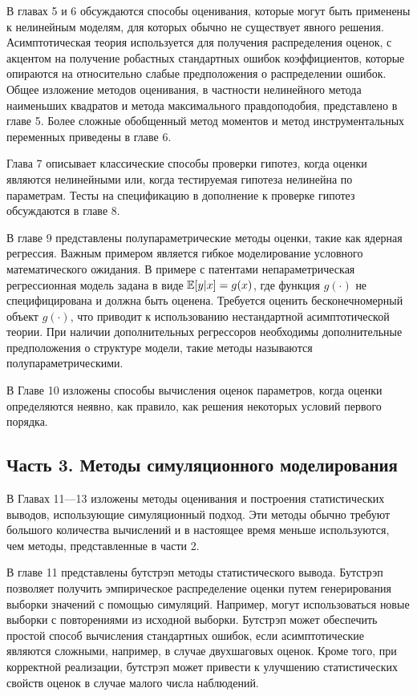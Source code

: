 В главах 5 и 6 обсуждаются способы оценивания, которые могут быть применены к нелинейным моделям, для которых обычно не существует явного решения. Асимптотическая теория используется для получения распределения оценок, с акцентом на получение робастных стандартных  ошибок коэффициентов, которые опираются на относительно слабые предположения о распределении ошибок. 
Общее изложение методов оценивания, в частности нелинейного метода наименьших квадратов и метода максимального правдоподобия, представлено в главе 5. Более сложные обобщенный метод моментов и метод инструментальных переменных приведены в главе 6.
	
	
Глава 7 описывает классические способы проверки гипотез, когда оценки являются нелинейными или, когда тестируемая гипотеза нелинейна по параметрам. Тесты на спецификацию  в дополнение к проверке гипотез обсуждаются в главе 8.
	
	
В главе 9 представлены полупараметрические методы оценки, такие как ядерная регрессия. Важным примером  является гибкое моделирование условного математического ожидания. В примере с патентами непараметрическая регрессионная модель задана в виде  $\mathbb{E}[y|x] = g(x)$, где функция $g(\cdot)$ не специфицирована и должна быть оценена. Требуется оценить бесконечномерный объект $g(\cdot)$, что приводит к использованию нестандартной асимптотической теории. При наличии дополнительных регрессоров необходимы  дополнительные предположения о структуре модели, такие  методы называются полупараметрическими.
	
	
В Главе 10 изложены способы вычисления оценок параметров, когда оценки определяются неявно, как правило, как решения некоторых условий первого порядка.

\subsection{Часть 3. Методы симуляционного моделирования}
	
В Главах 11---13 изложены методы оценивания и построения статистических выводов, использующие симуляционный подход. Эти методы обычно требуют большого количества вычислений и в настоящее время меньше используются, чем методы, представленные в части 2.
	
	
В главе 11 представлены бутстрэп методы статистического вывода. Бутстрэп позволяет получить  эмпирическое распределение оценки путем генерирования  выборки значений  с помощью симуляций. Например, могут использоваться новые выборки с повторениями из исходной выборки. Бутстрэп может обеспечить простой способ вычисления стандартных ошибок, если асимптотические являются сложными, например, в случае двухшаговых оценок. Кроме того, при корректной реализации, бутстрэп может привести к улучшению статистических свойств оценок в случае малого числа наблюдений.
	
